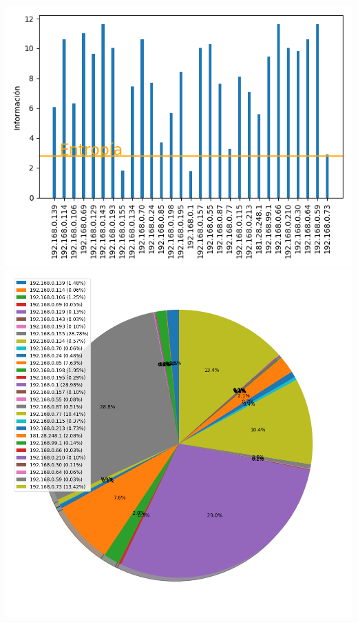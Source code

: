  \includegraphics[scale=0.6]{../plots/trabajo_s2_informacion.png}
 \includegraphics[scale=0.4]{../plots/trabajo_s2_probabilidades.png}

